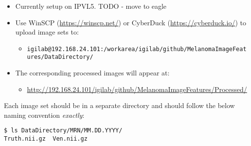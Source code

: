 \documentclass[10pt]{amsart}
\begin{document}
\begin{itemize}
\item Currently setup on IPVL5. TODO - move to eagle
\item
Use WinSCP (\href{https://winscp.net/}{https://winscp.net/})
or CyberDuck (\href{https://cyberduck.io/}{https://cyberduck.io/})
to upload image sets to:
\begin{itemize}
\item
\texttt{igilab@192.168.24.101:/workarea/igilab/github/MelanomaImageFeatures/DataDirectory/}
\end{itemize}

\item
The corresponding processed images will appear at:
\begin{itemize}
\item
\href{http://192.168.24.101/igilab/github/MelanomaImageFeatures/Processed/}{http://192.168.24.101/igilab/github/MelanomaImageFeatures/Processed/}
\end{itemize}
\end{itemize}


Each image set should be in a separate directory and should follow
the below naming convention \textit{exactly}:
\begin{verbatim}
$ ls DataDirectory/MRN/MM.DD.YYYY/
Truth.nii.gz  Ven.nii.gz
\end{verbatim}
\end{document}
